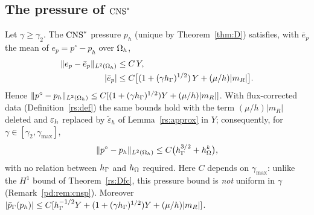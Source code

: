 \subsection{The pressure of \texorpdfstring{$\mathrm{CNS}^\ast$}{CNS*}}\label{pd:sec:cnsp}

\begin{theorem}\label{pd:thm:cnsp}
Let $\gamma\ge\gamma_2$. The $\mathrm{CNS}^\ast$ pressure $p_h$ (unique by Theorem~\ref{thm:D}) satisfies, with $\bar e_p$ the mean of $e_p=p^\circ-p_h$ over $\Omega_h$,
\begin{align*}
\lVert e_p-\bar e_p\rVert_{L^2(\Omega_h)}&\le C\,Y,\\
|\bar e_p|&\le C\bigl[(1+(\gamma h_\Gamma)^{1/2})\,Y+(\mu/h)|m_R|\bigr].
\end{align*}
Hence $\lVert p^\circ-p_h\rVert_{L^2(\Omega_h)}\le C[(1+(\gamma h_\Gamma)^{1/2})Y+(\mu/h)|m_R|]$. With flux-corrected data (Definition~\ref{rs:def}) the same bounds hold with the term $(\mu/h)|m_R|$ deleted and $\varepsilon_h$ replaced by $\tilde\varepsilon_h$ of Lemma~\ref{rs:approx} in $Y$; consequently, for $\gamma\in[\gamma_2,\gamma_{\max}]$,
\[
\lVert p^\circ-p_h\rVert_{L^2(\Omega_h)}\le C\bigl(h_\Gamma^{3/2}+h_\Omega^k\bigr),
\]
with no relation between $h_\Gamma$ and $h_\Omega$ required. Here $C$ depends on $\gamma_{\max}$: unlike the $H^1$ bound of Theorem~\ref{rs:Dfc}, this pressure bound is \emph{not} uniform in $\gamma$ (Remark~\ref{pd:rem:cnsp}). Moreover $|\bar p_{\Gamma}(p_h)|\le C[h_\Gamma^{-1/2}Y+(1+(\gamma h_\Gamma)^{1/2})Y+(\mu/h)|m_R|]$.
\end{theorem}

